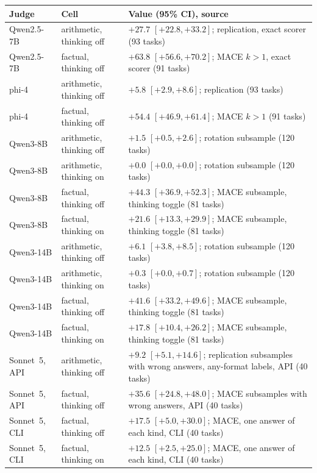 \begin{tabular}{llL{6.2cm}}
\toprule
Judge & Cell & Value (95\% CI), source \\
\midrule
Qwen2.5-7B & arithmetic, thinking off & $+27.7$ {\scriptsize$[+22.8,+33.2]$}; replication, exact scorer (93 tasks) \\
Qwen2.5-7B & factual, thinking off & $+63.8$ {\scriptsize$[+56.6,+70.2]$}; \textsc{MACE} $k{>}1$, exact scorer (91 tasks) \\
phi-4 & arithmetic, thinking off & $+5.8$ {\scriptsize$[+2.9,+8.6]$}; replication (93 tasks) \\
phi-4 & factual, thinking off & $+54.4$ {\scriptsize$[+46.9,+61.4]$}; \textsc{MACE} $k{>}1$ (91 tasks) \\
Qwen3-8B & arithmetic, thinking off & $+1.5$ {\scriptsize$[+0.5,+2.6]$}; rotation subsample (120 tasks) \\
Qwen3-8B & arithmetic, thinking on & $+0.0$ {\scriptsize$[+0.0,+0.0]$}; rotation subsample (120 tasks) \\
Qwen3-8B & factual, thinking off & $+44.3$ {\scriptsize$[+36.9,+52.3]$}; MACE subsample, thinking toggle (81 tasks) \\
Qwen3-8B & factual, thinking on & $+21.6$ {\scriptsize$[+13.3,+29.9]$}; MACE subsample, thinking toggle (81 tasks) \\
Qwen3-14B & arithmetic, thinking off & $+6.1$ {\scriptsize$[+3.8,+8.5]$}; rotation subsample (120 tasks) \\
Qwen3-14B & arithmetic, thinking on & $+0.3$ {\scriptsize$[+0.0,+0.7]$}; rotation subsample (120 tasks) \\
Qwen3-14B & factual, thinking off & $+41.6$ {\scriptsize$[+33.2,+49.6]$}; MACE subsample, thinking toggle (81 tasks) \\
Qwen3-14B & factual, thinking on & $+17.8$ {\scriptsize$[+10.4,+26.2]$}; MACE subsample, thinking toggle (81 tasks) \\
Sonnet~5, API & arithmetic, thinking off & $+9.2$ {\scriptsize$[+5.1,+14.6]$}; replication subsamples with wrong answers, any-format labels, API (40 tasks) \\
Sonnet~5, API & factual, thinking off & $+35.6$ {\scriptsize$[+24.8,+48.0]$}; MACE subsamples with wrong answers, API (40 tasks) \\
Sonnet~5, CLI & factual, thinking off & $+17.5$ {\scriptsize$[+5.0,+30.0]$}; MACE, one answer of each kind, CLI (40 tasks) \\
Sonnet~5, CLI & factual, thinking on & $+12.5$ {\scriptsize$[+2.5,+25.0]$}; MACE, one answer of each kind, CLI (40 tasks) \\
\bottomrule
\end{tabular}
